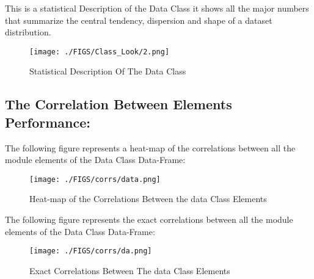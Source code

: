 \documentclass[12pt]{extreport}
\begin{document}
This is a statistical Description of the Data Class it shows all the major numbers that summarize the central tendency, dispersion and shape of a dataset distribution.
		\begin{figure}[H]
			\centering
			\texttt{[image: ./FIGS/Class\_Look/2.png]}
			\caption{Statistical Description Of The Data Class}
			\label{fig:4}
		\end{figure}

\subsection{The Correlation Between Elements Performance:}

The following figure represents a heat-map of the correlations between all the module elements of the Data Class Data-Frame:

\begin{figure}[H]
	\centering 
	\texttt{[image: ./FIGS/corrs/data.png]}
	\caption{Heat-map of the Correlations Between the data Class Elements}
	\label{fig:80}
\end{figure}


The following figure represents the exact correlations between all the module elements of the Data Class Data-Frame:
\begin{figure}[H]
	\centering
	\texttt{[image: ./FIGS/corrs/da.png]}
	\caption{Exact Correlations Between The data Class Elements}
	\label{fig:5}
\end{figure}



\begin{comment}

\begin{itemize}
\item OBSERVATIONS:
\end{itemize}
-- The Correlations that surpass the threshold 0.5 in this data-frame are:


\begin{enumerate}
\item Cor( SUD142, SUD522 ) = 0.58
\item Cor( SUD142, SUD443 ) = 0.56
\item Cor( SUD142, SUD441 ) = 0.57
\item Cor( SUD142, SUD433 ) = 0.51
\item Cor( SUD142, SUD242 ) = 0.59
\item Cor( SUD242, SUD521 ) = 0.57
\item Cor( SUD433, SUD522 ) = 0.64
\item Cor( SUD433, SUD521 ) = 0.59
\item Cor( SUD433, SUD443 ) = 0.68
\item Cor( SUD441, SUD521 ) = 0.62
\item Cor( SUD441, SUD443 ) = 0.82
\item Cor( SUD443, SUD522 ) = 0.68
\item Cor( SUD443, SUD521 ) = 0.58
\item Cor( SUD521, SUD522 ) = 0.54
\end{enumerate} 
\end{comment}
\end{document}
